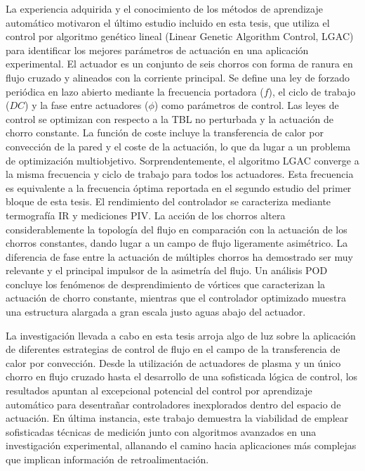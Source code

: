 \begin{abstrakt}
    La experiencia adquirida y el conocimiento de los métodos de aprendizaje automático motivaron el último estudio incluido en esta tesis, que utiliza el control por algoritmo genético lineal (Linear Genetic Algorithm Control, LGAC) para identificar los mejores parámetros de actuación en una aplicación experimental. El actuador es un conjunto de seis chorros con forma de ranura en flujo cruzado y alineados con la corriente principal. Se define una ley de forzado periódica en lazo abierto mediante la frecuencia portadora ($f$), el ciclo de trabajo ($DC$) y la fase entre actuadores ($\phi$) como parámetros de control. Las leyes de control se optimizan con respecto a la TBL no perturbada y la actuación de chorro constante. La función de coste incluye la transferencia de calor por convección de la pared y el coste de la actuación, lo que da lugar a un problema de optimización multiobjetivo. Sorprendentemente, el algoritmo LGAC converge a la misma frecuencia y ciclo de trabajo para todos los actuadores. Esta frecuencia es equivalente a la frecuencia óptima reportada en el segundo estudio del primer bloque de esta tesis. El rendimiento del controlador se caracteriza mediante termografía IR y mediciones PIV. La acción de los chorros altera considerablemente la topología del flujo en comparación con la actuación de los chorros constantes, dando lugar a un campo de flujo ligeramente asimétrico. La diferencia de fase entre la actuación de múltiples chorros ha demostrado ser muy relevante y el principal impulsor de la asimetría del flujo. Un análisis POD concluye los fenómenos de desprendimiento de vórtices que caracterizan la actuación de chorro constante, mientras que el controlador optimizado muestra una estructura alargada a gran escala justo aguas abajo del actuador.
    
    La investigación llevada a cabo en esta tesis arroja algo de luz sobre la aplicación de diferentes estrategias de control de flujo en el campo de la transferencia de calor por convección. Desde la utilización de actuadores de plasma y un único chorro en flujo cruzado hasta el desarrollo de una sofisticada lógica de control, los resultados apuntan al excepcional potencial del control por aprendizaje automático para desentrañar controladores inexplorados dentro del espacio de actuación. En última instancia, este trabajo demuestra la viabilidad de emplear sofisticadas técnicas de medición junto con algoritmos avanzados en una investigación experimental, allanando el camino hacia aplicaciones más complejas que implican información de retroalimentación.

\end{abstrakt}